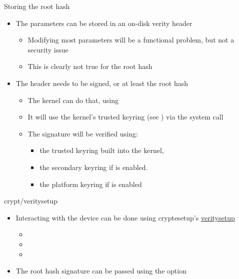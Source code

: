 \begin{frame}{Storing the root hash}
  \begin{itemize}
    \item The parameters can be stored in an on-disk verity header
    \begin{itemize}
      \item Modifying most parameters will be a functional problem, but not a security issue
      \item This is clearly not true for the root hash
    \end{itemize}
    \item The header needs to be signed, or at least the root hash
    \begin{itemize}
      \item The kernel can do that, using 
      \item It will use the kernel's trusted keyring (see )
            via the  system call
      \item The signature will be verified using:
      \begin{itemize}
        \item the trusted keyring built into the kernel,
        \item the secondary keyring if 
              is enabled.
        \item the platform keyring if 
              is enabled
      \end{itemize}
    \end{itemize}
  \end{itemize}
\end{frame}

\begin{frame}{crypt/veritysetup}
  \begin{itemize}
    \item Interacting with the device can be done using cryptesetup's
          \href{https://gitlab.com/cryptsetup/cryptsetup/-/blob/main/src/veritysetup.c}{veritysetup}
    \begin{itemize}
      \item {}
      \item {}
      \item {}
    \end{itemize}
    \item The root hash signature can be passed using the  option
  \end{itemize}
\end{frame}

